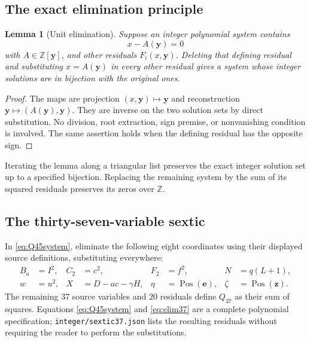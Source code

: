 \documentclass[11pt,a4paper]{article}
\newtheorem{lemma}[theorem]{Lemma}
\theoremstyle{definition}
\theoremstyle{remark}
\newcommand{\Z}{\mathbb Z}
\newcommand{\pos}{\operatorname{Pos}}
\newcommand{\sourcepath}[1]{\texttt{\small #1}}
\begin{document}
\subsection{The exact elimination principle}

\begin{lemma}[Unit elimination]
\label{lem:eliminate}
Suppose an integer polynomial system contains
\[
 x-A(\boldsymbol y)=0
\]
with \(A\in\Z[\boldsymbol y]\), and other residuals
\(F_i(x,\boldsymbol y)\). Deleting that defining residual and
substituting \(x=A(\boldsymbol y)\) in every other residual gives a
system whose integer solutions are in bijection with the original ones.
\end{lemma}
\begin{proof}
The maps are projection \((x,\boldsymbol y)\mapsto\boldsymbol y\)
and reconstruction
\(\boldsymbol y\mapsto(A(\boldsymbol y),\boldsymbol y)\).
They are inverse on the two solution sets by direct substitution.
No division, root extraction, sign premise, or nonvanishing condition
is involved. The same assertion holds when the defining residual has
the opposite sign.
\end{proof}

Iterating the lemma along a triangular list preserves the exact integer
solution set up to a specified bijection. Replacing the remaining system
by the sum of its squared residuals preserves its zeros over \(\Z\).

\subsection{The thirty-seven-variable sextic}

In \eqref{eq:Q45system}, eliminate the following eight coordinates using
their displayed source definitions, substituting everywhere:
\begin{equation}
 \begin{aligned}
 B_a&=I^2,& C_2&=c^2,& F_2&=f^2,& N&=q(L+1),\\
 w&=u^2,& X&=D-ac-\gamma H,&
 \eta&=\pos(\boldsymbol e),&
 \zeta&=\pos(\boldsymbol z).
 \end{aligned}                              \label{eq:elim37}
\end{equation}
The remaining \(37\) source variables and \(20\) residuals define
\(Q_{37}\) as their sum of squares. Equations
\eqref{eq:Q45system} and \eqref{eq:elim37} are a complete polynomial
specification; \sourcepath{integer/sextic37.json} lists the resulting
residuals without requiring the reader to perform the substitutions.
\end{document}
